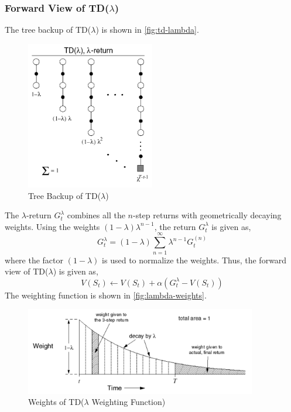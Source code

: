 \subsubsection{Forward View of TD(\(\lambda \))}

The tree backup of TD(\(\lambda \)) is shown in \autoref{fig:td-lambda}.
\begin{figure}[H]
    \centering
    \includegraphics[width=0.5\textwidth]{figures/l-return.png}
    \caption{Tree Backup of TD(\(\lambda \))}
    \label{fig:td-lambda}
\end{figure}
The \(\lambda\)-return \(G_t^\lambda \) combines all the \(n\)-step returns with 
geometrically decaying weights. Using the weights \((1-\lambda)\lambda^{n-1}\), the return
\(G_t^\lambda \) is given as,
\[
    G_t^\lambda = (1-\lambda)\sum_{n=1}^{\infty}\lambda^{n-1}G_t^{(n)}
\]
where the factor \((1-\lambda)\) is used to normalize the weights. Thus, the forward view
of TD(\(\lambda \)) is given as,
\[
    V(S_t) \leftarrow V(S_t) + \alpha\left( 
        G_t^\lambda - V(S_t)
     \right)
\]
The weighting function is shown in \autoref{fig:lambda-weights}.
\begin{figure}[H]
    \centering
    \includegraphics[width=0.9\textwidth]{figures/l-weights.png}
    \caption{Weights of TD(\(\lambda \) Weighting Function)}
    \label{fig:lambda-weights}
\end{figure}

